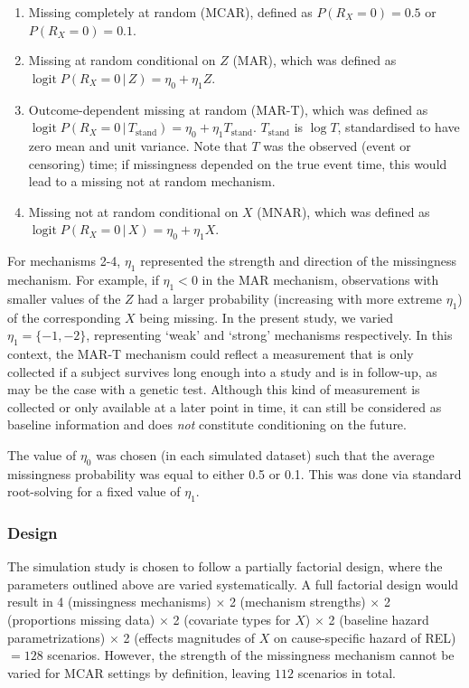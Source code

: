 \documentclass[
  letterpaper,
  DIV=11,
  numbers=noendperiod]{scrreprt}
\DeclareMathOperator{\logit}{logit}
\newcommand{\given}{\,|\,}
\begin{document}
\begin{enumerate}
\def\labelenumi{\arabic{enumi}.}
\item
  Missing completely at random (MCAR), defined as \(P(R_X = 0) = 0.5\)
  or \(P(R_X = 0) = 0.1\).
\item
  Missing at random conditional on \(Z\) (MAR), which was defined as
  \(\logit P(R_X = 0 \given Z) = \eta_0 + \eta_1 Z\).
\item
  Outcome-dependent missing at random (MAR-T), which was defined as
  \(\logit P(R_X = 0 \given T_{\text{stand}}) = \eta_0 + \eta_1 T_{\text{stand}}\).
  \(T_{\text{stand}}\) is \(\log T\), standardised to have zero mean and
  unit variance. Note that \(T\) was the observed (event or censoring)
  time; if missingness depended on the true event time, this would lead
  to a missing not at random mechanism.
\item
  Missing not at random conditional on \(X\) (MNAR), which was defined
  as \(\logit P(R_X = 0 \given X) = \eta_0 + \eta_1 X\).
\end{enumerate}

For mechanisms 2-4, \(\eta_1\) represented the strength and direction of
the missingness mechanism. For example, if \(\eta_1 < 0\) in the MAR
mechanism, observations with smaller values of the \(Z\) had a larger
probability (increasing with more extreme \(\eta_1\)) of the
corresponding \(X\) being missing. In the present study, we varied
\(\eta_1 = \{-1, -2\}\), representing `weak' and `strong' mechanisms
respectively. In this context, the MAR-T mechanism could reflect a
measurement that is only collected if a subject survives long enough
into a study and is in follow-up, as may be the case with a genetic
test. Although this kind of measurement is collected or only available
at a later point in time, it can still be considered as baseline
information and does \emph{not} constitute conditioning on the future.

The value of \(\eta_0\) was chosen (in each simulated dataset) such that
the average missingness probability was equal to either 0.5 or 0.1. This
was done via standard root-solving for a fixed value of \(\eta_1\).

\subsubsection{Design}\label{design}

The simulation study is chosen to follow a partially factorial design,
where the parameters outlined above are varied systematically. A full
factorial design would result in 4 (missingness mechanisms) \(\times\) 2
(mechanism strengths) \(\times\) 2 (proportions missing data) \(\times\)
2 (covariate types for \(X\)) \(\times\) 2 (baseline hazard
parametrizations) \(\times\) 2 (effects magnitudes of \(X\) on
cause-specific hazard of REL) \(= 128\) scenarios. However, the strength
of the missingness mechanism cannot be varied for MCAR settings by
definition, leaving \(112\) scenarios in total.
\end{document}
